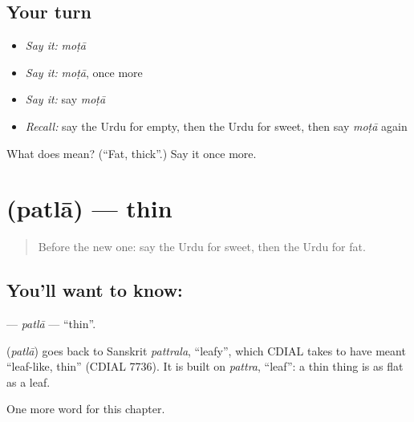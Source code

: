 \subsection*{Your turn}
\begin{itemize}
\raggedright
  \item \emph{Say it:} \emph{moṭā}
  \item \emph{Say it:} \emph{moṭā}, once more
  \item \emph{Say it:} say \emph{moṭā}
  \item \emph{Recall:} say the Urdu for empty, then the Urdu for sweet, then say \emph{moṭā} again
\end{itemize}

\begin{tcolorbox}[breakable,colback=teal!4,colframe=teal!35!black,title={Before you move on}]
What does  mean? (\textquotedblleft{}Fat, thick\textquotedblright{}.) Say it once more.
\end{tcolorbox}
\section[\texorpdfstring{\ur{پتلا} (patlā)}{پتلا (patlā)}]{ (patlā) — thin}

\label{lesson:UR-C73-patla}



\begin{quote}
Before the new one: say the Urdu for sweet, then the Urdu for fat.
\end{quote}

\subsection*{You'll want to know: }
\textbf{} — \emph{patlā} — \textquotedblleft{}thin\textquotedblright{}.

\begin{cousinweb}
\textbf{} (\emph{patlā}) goes back to Sanskrit \emph{pattrala}, \textquotedblleft{}leafy\textquotedblright{}, which CDIAL takes to have meant \textquotedblleft{}leaf-like, thin\textquotedblright{} (CDIAL 7736). It is built on \emph{pattra}, \textquotedblleft{}leaf\textquotedblright{}: a thin thing is as flat as a leaf.
\end{cousinweb}

\begin{grammarlens}[title={What you've built}]
One more word for this chapter.
\end{grammarlens}

